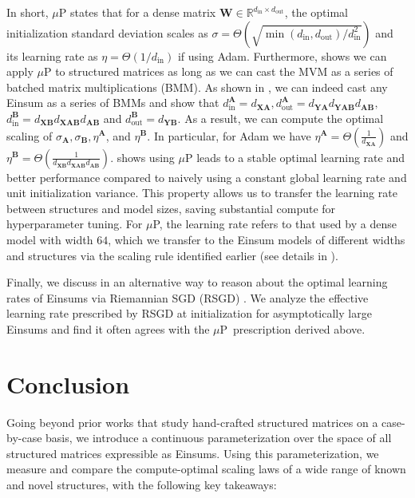\documentclass{article}
\newcommand{\mbf}[1]{{\boldsymbol{\mathbf{#1}}}}
\newcommand{\bm}{\mbf}
\newcommand{\din}{{d_\mathrm{in}}}
\newcommand{\dout}{{d_\mathrm{out}}}
\newcommand{\mup}{$\mu$P}
\begin{document}
In short, $\mu$P states that for a dense matrix $\bm{W} \in \mathbb{R}^{\din \times \dout}$, the optimal initialization standard deviation scales
as $\sigma = \Theta(\sqrt{\min(\din, \dout) / d^{2}_{\text{in}}})$
and its learning rate as $\eta=\Theta(1/ \din)$ if using Adam. Furthermore, \citet{qiu2024compute} shows we can apply $\mu$P to structured matrices as long as we can cast the MVM as a series of batched matrix multiplications (BMM). As shown in , we can indeed cast any Einsum as a series of BMMs and show that $d_{\text{in}}^{\bm{A}} = d_{\bm{X}\bm{A}},
d_{\text{out}}^{\bm{A}} = d_{\bm{Y}\bm{A}} d_{\bm{Y} \bm{A} \bm{B}} d_{\bm{A}\bm{B}},$
$d_{\text{in}}^{\bm{B}} = d_{\bm{X} \bm{B}} d_{\bm{X} \bm{A} \bm{B}} d_{\bm{A} \bm{B}}$
and $d_{\text{out}}^{\bm{B}} = d_{\bm{Y}\bm{B}}$.
As a result, we can compute the optimal scaling of $\sigma_{\bm{A}}, \sigma_{\bm{B}}, \eta^{\bm{A}}$, and $\eta^{\bm{B}}.$ In particular, for Adam we have $\eta^{\bm{A}} = \Theta(\frac{1}{d_{\bm{X} \bm{A}}})$ and
$\eta^{\bm{B}} = \Theta(\frac{1}{d_{\bm{X} \bm{B}} d_{\bm{X} \bm{A} \bm{B}} d_{\bm{A} \bm{B}}})$.
 shows using $\mu$P leads to a stable optimal learning rate and better performance compared to naively using a constant global learning rate and unit initialization variance. This property allows us to transfer the learning rate between structures and model sizes, saving substantial compute for hyperparameter tuning. For \mup, the learning rate refers to that used by a dense model with width $64$, which we transfer to the Einsum models of different widths and structures via the scaling rule identified earlier (see details in ).

Finally, we discuss in  an alternative way to reason about the optimal learning rates of Einsums via Riemannian SGD (RSGD) \citep{bonnabel2011rsgd}. We analyze the effective learning rate prescribed by RSGD at initialization for asymptotically large Einsums and find it often agrees with the \mup\ prescription derived above.

\section{Conclusion}
Going beyond prior works that study hand-crafted structured matrices on a case-by-case basis, we introduce a continuous parameterization over the space of all structured matrices expressible as Einsums. Using this parameterization, we measure and compare the compute-optimal scaling laws of a wide range of known and novel structures, with the following key takeaways:
\end{document}
